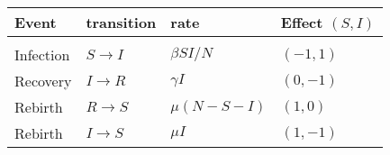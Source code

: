 \documentclass[12pt]{article}
\begin{document}
\begin{center}\begin{tabular}{llll}
   {\bf Event} & {\bf transition} &{\bf rate} &{\bf Effect $(S,I)$}
   \\ \hline
   \\ Infection &$S \to I$  &$\beta SI/N$ & $(-1,1)$
   \\ Recovery & $I \to R$ & $\gamma I$ & $(0,-1)$
   \\ Rebirth &  $R \to S$ & $\mu (N-S-I)$ & $(1,0)$
   \\ Rebirth & $I \to S$ & $\mu I$ & $(1,-1)$
\end{tabular}\end{center}
\end{document}
